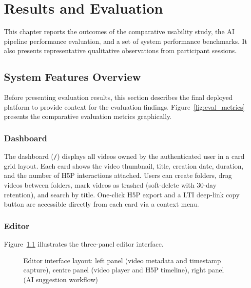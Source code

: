 \chapter{Results and Evaluation}

This chapter reports the outcomes of the comparative usability study, the
AI pipeline performance evaluation, and a set of system performance
benchmarks. It also presents representative qualitative observations from
participant sessions.

\section{System Features Overview}

Before presenting evaluation results, this section describes the final
deployed platform to provide context for the evaluation findings.
Figure~\ref{fig:eval_metrics} presents the comparative evaluation metrics
graphically.

\subsection{Dashboard}

The dashboard (\texttt{/}) displays all videos owned by the authenticated
user in a card grid layout. Each card shows the video thumbnail, title,
creation date, duration, and the number of H5P interactions attached.
Users can create folders, drag videos between folders, mark videos as
trashed (soft-delete with 30-day retention), and search by title.
One-click H5P export and a LTI deep-link copy button are accessible
directly from each card via a context menu.

\subsection{Editor}

Figure~\ref{fig:editor_layout} illustrates the three-panel editor interface.

\begin{figure}[H]
  \centering
  \resizebox{\linewidth}{!}{}
  \caption{Editor interface layout: left panel (video metadata and timestamp
           capture), centre panel (video player and H5P timeline), right
           panel (AI suggestion workflow)}
  \label{fig:editor_layout}
\end{figure}

